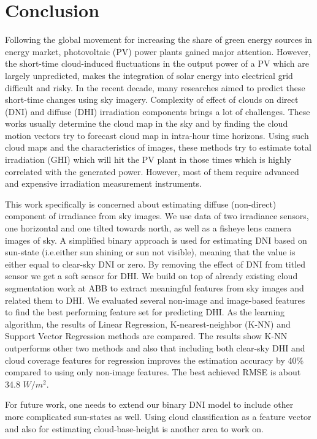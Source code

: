 \chapter{Conclusion}
\label{sec:conclusion_chapter}
Following the global movement for increasing the share of green energy sources in energy market, photovoltaic (PV) power plants gained major attention. However, the short-time cloud-induced fluctuations in the output power of a PV which are largely unpredicted, makes the integration of solar energy into electrical grid difficult and risky. In the recent decade, many researches aimed to predict these short-time changes using sky imagery. Complexity of effect of clouds on direct (DNI) and diffuse (DHI) irradiation components brings a lot of challenges. These works usually determine the cloud map in the sky and by finding the cloud motion vectors try to forecast cloud map in intra-hour time horizons. Using such cloud maps and the characteristics of images, these methods try to estimate total irradiation (GHI) which will hit the PV plant in those times which is highly correlated with the generated power. However, most of them require advanced and expensive irradiation measurement instruments.


This work specifically is concerned about estimating diffuse (non-direct) component of irradiance from sky images. We use data of two irradiance sensors, one horizontal and one tilted towards north, as well as a fisheye lens camera images of sky. A simplified binary approach is used for estimating DNI based on sun-state (i.e.either sun shining or sun not visible), meaning that the value is either equal to clear-sky DNI or zero. By removing the effect of DNI from titled sensor we get a soft sensor for DHI. We build on top of already existing cloud segmentation work at ABB to extract meaningful features from sky images and related them to DHI. We evaluated several non-image and image-based features to find the best performing feature set for predicting DHI. As the learning algorithm, the results of Linear Regression, K-nearest-neighbor (K-NN) and Support Vector Regression methods are compared. The results show K-NN outperforms other two methods and also that including both clear-sky DHI and cloud coverage features for regression improves the estimation accuracy by 40\% compared to using only non-image features. The best achieved RMSE is about 34.8 $W/m^2$.


For future work, one needs to extend our binary DNI model to include other more complicated sun-states as well. Using cloud classification as a feature vector and also for estimating cloud-base-height is another area to work on.